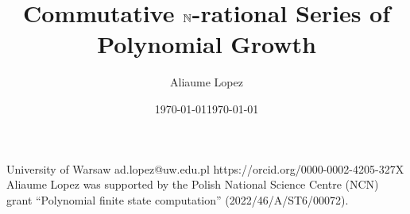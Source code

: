 \date{\today}

\title{Commutative $\mathbb{N}$-rational Series of Polynomial Growth}

\author{Aliaume Lopez}%
       {University of Warsaw}%
       {ad.lopez@uw.edu.pl}%
       {https://orcid.org/0000-0002-4205-327X}%
       {Aliaume Lopez was supported by the Polish National Science Centre (NCN) grant “Polynomial
finite state computation” (2022/46/A/ST6/00072).}


\date{\today}


\category{} %
\relatedversion{} %



\newcommand{\acknowledge}{
}

\newcommand{\makeabstract}{
    \begin{abstract}
This paper studies which functions computed by $\Rel$-weighted automata can be
realised by $\Nat$-weighted automata, under two extra assumptions:
commutativity (the order of letters in the input does not matter) and
polynomial growth (the output of the function is bounded by a polynomial in the
size of the input). We
leverage this effective characterization to decide whether a function computed
by a commutative $\Nat$-weighted automaton of polynomial growth is star-free, a
notion borrowed from the theory of regular languages that has been the subject
of many investigations in the context of string-to-string functions
during the last decade. 
    \end{abstract}
}

\EventLogo{}
